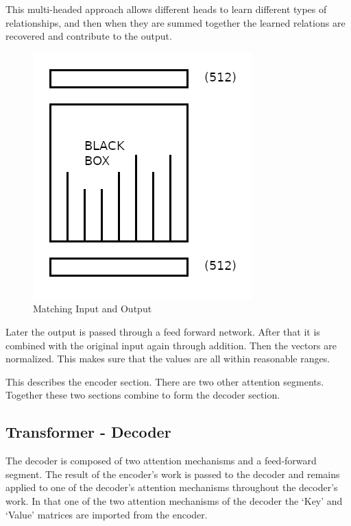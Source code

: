 This multi-headed approach allows different heads to learn different types of relationships, and then when they are summed together the learned relations are recovered and contribute to the output.

\begin{figure}[H]
	\begin{center}
		
	
	\includegraphics[scale=0.5]{diagram-mat02}
\end{center}
	\caption[Matching Input and Output]{Matching Input and Output}
	
\end{figure}


Later the output is passed through a feed forward network. After that it is combined with the original input again through addition. Then the vectors are normalized. This makes sure that the values are all within reasonable ranges.

This describes the encoder section. There are two other attention segments. Together these two sections combine to form the decoder section.

\subsection*{Transformer - Decoder}
The decoder is composed of two attention mechanisms and a feed-forward segment. The result of the encoder's work is passed to the decoder and remains applied to one of the decoder's attention mechanisms throughout the decoder's work. In that one of the two attention mechanisms of the decoder the `Key' and `Value' matrices are imported from the encoder. 


